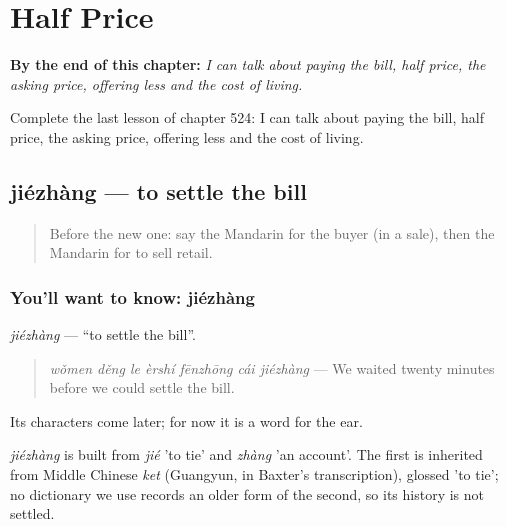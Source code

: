 
\chapter{Half Price}
\label{ch:zh-half-price}

\begin{chapteropening}
\textbf{By the end of this chapter:} \emph{I can talk about paying the bill, half price, the asking price, offering less and the cost of living.}

Complete the last lesson of chapter 524: I can talk about paying the bill, half price, the asking price, offering less and the cost of living.
\end{chapteropening}

\section[jiézhàng]{jiézhàng — to settle the bill}

\label{lesson:ZH-C524-jiezhang}



\begin{quote}
Before the new one: say the Mandarin for the buyer (in a sale), then the Mandarin for to sell retail.
\end{quote}

\subsection*{You'll want to know: jiézhàng}
\emph{jiézhàng} — \textquotedblleft{}to settle the bill\textquotedblright{}.

\begin{quote}
\emph{wǒmen děng le èrshí fēnzhōng cái jiézhàng} — We waited twenty minutes before we could settle the bill.
\end{quote}

Its characters come later; for now it is a word for the ear.

\begin{cousinweb}
\emph{jiézhàng} is built from \emph{jié} 'to tie' and \emph{zhàng} 'an account'. The first is inherited from Middle Chinese \emph{ket} (Guangyun, in Baxter's transcription), glossed 'to tie'; no dictionary we use records an older form of the second, so its history is not settled.
\end{cousinweb}

